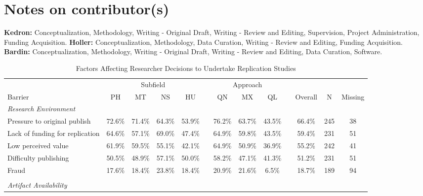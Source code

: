 \documentclass[]{interact}
\theoremstyle{plain}%
\theoremstyle{definition}
\theoremstyle{remark}
\begin{document}
\section*{Notes on contributor(s)}
\textbf{Kedron:} Conceptualization, Methodology, Writing - Original Draft, Writing - Review and Editing, Supervision, Project Administration, Funding Acquisition. \textbf{Holler:} Conceptualization, Methodology, Data Curation, Writing - Review and Editing, Funding Acquisition. \textbf{Bardin:} Conceptualization, Methodology, Writing - Original Draft, Writing - Review and Editing, Data Curation, Software.


\newpage


\newpage
\begin{landscape}
\begin{table}[h]
    \centering
    \begin{threeparttable}
    \caption{Factors Affecting Researcher Decisions to Undertake Replication Studies }
    \begin{tabular}{l c c c c c c c c c c c c}
         \hline
                    & \multicolumn{4}{1}{Subfield}  & & \multicolumn{3}{1}{Approach} & & & & \\
         Barrier    & PH & MT & NS & HU            & & QN & MX & QL              & & Overall & N & Missing\\
         \hline
         \textit{Research Environment}      & & & & & & & & & & \\
         Pressure to original publish       & 72.6\% & 71.4\% & 64.3\% & 53.9\% & & 76.2\% & 63.7\% & 43.5\% & & 66.4\% & 245 & 38 \\
         Lack of funding for replication    & 64.6\% & 57.1\% & 69.0\% & 47.4\% & & 64.9\% & 59.8\% & 43.5\% & & 59.4\% & 231 & 51 \\
         Low perceived value                & 61.9\% & 59.5\% & 55.1\% & 42.1\% & & 64.9\% & 50.9\% & 36.9\% & & 55.2\% & 242 & 41 \\
         Difficulty publishing              & 50.5\% & 48.9\% & 57.1\% & 50.0\% & & 58.2\% & 47.1\% & 41.3\% & & 51.2\% & 231 & 51 \\
         Fraud                              & 17.6\% & 18.4\% & 23.8\% & 18.4\% & & 20.9\% & 21.6\% & 6.5\%  & & 18.7\% & 189 & 94 \\
                                            & & & & & & & & & & & & \\
         \textit{Artifact Availability}     & & & & & & & & & & & & \\

\end{tabular}
\end{threeparttable}
\end{table}
\end{landscape}
\end{document}

